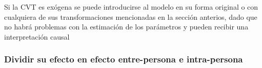 \documentclass[spanish]{article}
\numberwithin{figure}{subsection}
\numberwithin{equation}{subsection}
\numberwithin{table}{subsection}
\begin{document}
Si la CVT es exógena se puede introducirse al modelo en su forma original o con
cualquiera de sus transformaciones mencionadas en la sección anterios, dado que
no habrá problemas con la estimación de los parámetros y pueden recibir una
interpretación causal

\subsubsection{Dividir su efecto en efecto entre-persona e intra-persona}




\end{document}
